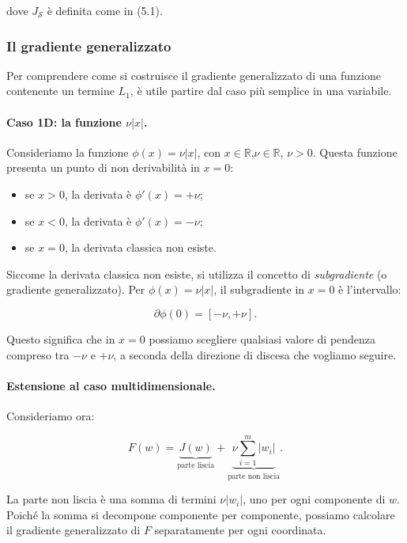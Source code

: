 \documentclass[a4paper,12pt]{article}
\numberwithin{equation}{section}
\numberwithin{figure}{section}
\numberwithin{table}{section}
\begin{document}
dove $J_{\mathcal{S}}$ è definita come in (5.1).

\subsubsection{Il gradiente generalizzato}

Per comprendere come si costruisce il gradiente generalizzato di una funzione
contenente un termine $L_1$, è utile partire dal caso più semplice in una variabile.

\paragraph{Caso 1D: la funzione $\nu|x|$.}

Consideriamo la funzione $\phi(x) = \nu |x|$, con $x\in\mathbb{R}$,\newline $\nu \in\mathbb{R}$, $\nu> 0$. Questa funzione
presenta un punto di non derivabilità in $x = 0$:

\begin{itemize}
    \item se $x > 0$, la derivata è $\phi'(x) = +\nu$;
    \item se $x < 0$, la derivata è $\phi'(x) = -\nu$;
    \item se $x = 0$, la derivata classica non esiste.
\end{itemize}

Siccome la derivata classica non esiste, si utilizza
il concetto di \emph{subgradiente} (o gradiente generalizzato). Per
$\phi(x) = \nu|x|$, il subgradiente in $x = 0$ è l'intervallo:

\[
\partial \phi(0) = [-\nu, +\nu].
\]

Questo significa che in $x = 0$ possiamo scegliere qualsiasi valore di pendenza
compreso tra $-\nu$ e $+\nu$, a seconda della direzione di discesa che vogliamo
seguire.

\paragraph{Estensione al caso multidimensionale.}

Consideriamo ora:

\[
F(w) = \underbrace{J(w)}_{\text{parte liscia}} + \underbrace{\nu \sum_{i=1}^m |w_i|}_{\text{parte non liscia}}.
\]

La parte non liscia è una somma di termini $\nu |w_i|$, uno per ogni componente
di $w$. Poiché la somma si decompone componente per componente, possiamo
calcolare il gradiente generalizzato di $F$ separatamente per ogni coordinata.
\end{document}
